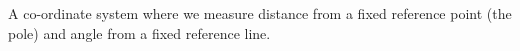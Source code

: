 A co-ordinate system where we measure distance
from a fixed reference point (the pole) and angle
from a fixed reference line.